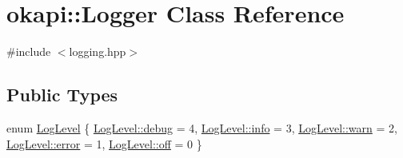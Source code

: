 \hypertarget{classokapi_1_1Logger}{}\section{okapi\+::Logger Class Reference}
\label{classokapi_1_1Logger}


{\ttfamily \#include $<$logging.\+hpp$>$}

\subsection*{Public Types}
\begin{DoxyCompactItemize}
\item 
enum \mbox{\hyperlink{classokapi_1_1Logger_a66826a92c568743a2722d3c3f6887d81}{Log\+Level}} \{ \newline
\mbox{\hyperlink{classokapi_1_1Logger_a66826a92c568743a2722d3c3f6887d81aad42f6697b035b7580e4fef93be20b4d}{Log\+Level\+::debug}} = 4, 
\mbox{\hyperlink{classokapi_1_1Logger_a66826a92c568743a2722d3c3f6887d81acaf9b6b99962bf5c2264824231d7a40c}{Log\+Level\+::info}} = 3, 
\mbox{\hyperlink{classokapi_1_1Logger_a66826a92c568743a2722d3c3f6887d81a1ea4c3ab05ee0c6d4de30740443769cb}{Log\+Level\+::warn}} = 2, 
\mbox{\hyperlink{classokapi_1_1Logger_a66826a92c568743a2722d3c3f6887d81acb5e100e5a9a3e7f6d1fd97512215282}{Log\+Level\+::error}} = 1, 
\newline
\mbox{\hyperlink{classokapi_1_1Logger_a66826a92c568743a2722d3c3f6887d81a3262d48df5d75e3452f0f16b313b7808}{Log\+Level\+::off}} = 0
 \}
\end{DoxyCompactItemize}
